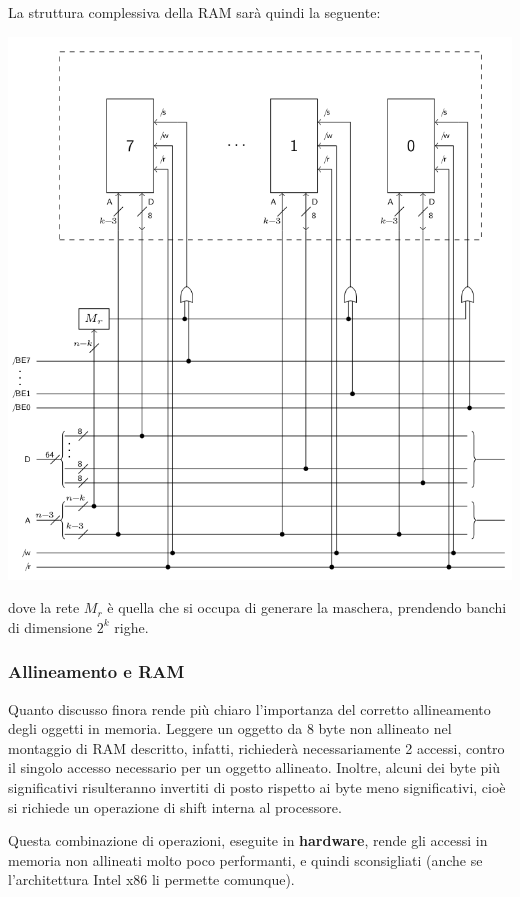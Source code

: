 \documentclass[a4paper,11pt]{article}
\begin{document}
La struttura complessiva della RAM sarà quindi la seguente:
\begin{center}
	\includegraphics[scale=0.6]{../figures/ram.png}
\end{center}
dove la rete $M_r$ è quella che si occupa di generare la maschera, prendendo banchi di dimensione $2^k$ righe.

\subsubsection{Allineamento e RAM}
Quanto discusso finora rende più chiaro l'importanza del corretto allineamento degli oggetti in memoria.
Leggere un oggetto da 8 byte non allineato nel montaggio di RAM descritto, infatti, richiederà necessariamente 2 accessi, contro il singolo accesso necessario per un oggetto allineato.
Inoltre, alcuni dei byte più significativi risulteranno invertiti di posto rispetto ai byte meno significativi, cioè si richiede un operazione di shift interna al processore.

Questa combinazione di operazioni, eseguite in \textbf{hardware}, rende gli accessi in memoria non allineati molto poco performanti, e quindi sconsigliati (anche se l'architettura Intel x86 li permette comunque).
\end{document}
